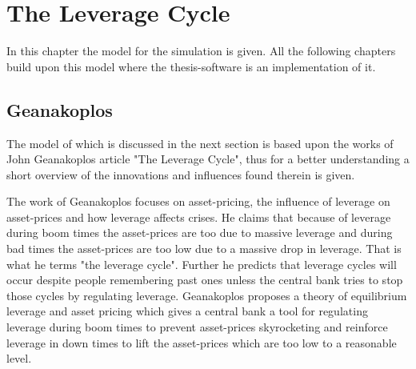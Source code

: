 \documentclass[../Bachelorarbeit.tex]{subfiles}
\begin{document}
\chapter{The Leverage Cycle}
\label{ch:leverageCycle}

In this chapter the model for the simulation is given. All the following chapters build upon this model where the thesis-software is an implementation of it. 

\section{Geanakoplos}
The model of \cite{Breuer2015} which is discussed in the next section is based upon the works of John Geanakoplos article \cite{Geanakoplos2009} "The Leverage Cycle", thus for a better understanding a short overview of the innovations and influences found therein is given.

\medskip

The work of Geanakoplos focuses on asset-pricing, the influence of leverage on asset-prices and how leverage affects crises. He claims that because of leverage during boom times the asset-prices are too due to massive leverage and during bad times the asset-prices are too low due to a massive drop in leverage. That is what he terms "the leverage cycle". Further he predicts that leverage cycles will occur despite people remembering past ones unless the central bank tries to stop those cycles by regulating leverage. Geanakoplos proposes a theory of equilibrium leverage and asset pricing which gives a central bank a tool for regulating leverage during boom times to prevent asset-prices skyrocketing and reinforce leverage in down times to lift the asset-prices which are too low to a reasonable level.
\end{document}
